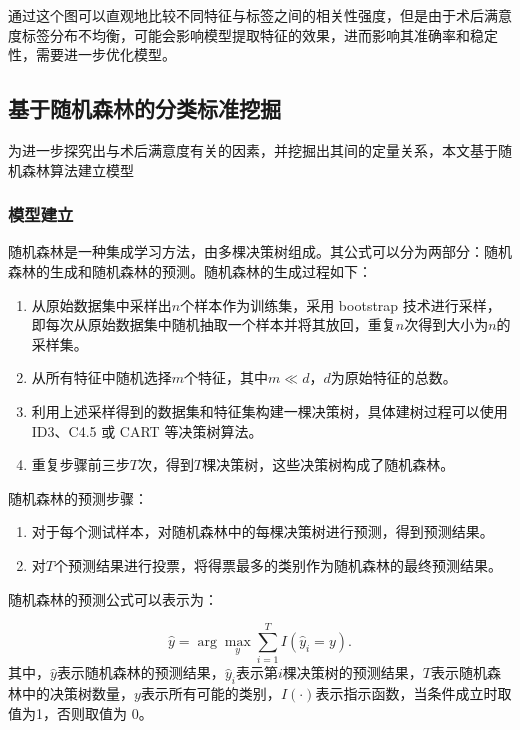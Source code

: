 通过这个图可以直观地比较不同特征与标签之间的相关性强度，但是由于术后满意度标签分布不均衡，可能会影响模型提取特征的效果，进而影响其准确率和稳定性，需要进一步优化模型。


\subsection{基于随机森林的分类标准挖掘}

为进一步探究出与术后满意度有关的因素，并挖掘出其间的定量关系，本文基于随机森林算法建立模型

\subsubsection{模型建立}

随机森林是一种集成学习方法，由多棵决策树组成。其公式可以分为两部分：随机森林的生成和随机森林的预测。随机森林的生成过程如下：

\begin{enumerate}
  \item 从原始数据集中采样出$n$个样本作为训练集，采用 bootstrap 技术进行采样，即每次从原始数据集中随机抽取一个样本并将其放回，重复$n$次得到大小为$n$的采样集。
  \item 从所有特征中随机选择$m$个特征，其中$m\ll d$，$d$为原始特征的总数。
  \item 利用上述采样得到的数据集和特征集构建一棵决策树，具体建树过程可以使用 ID3、C4.5 或 CART 等决策树算法。
  \item 重复步骤前三步$T$次，得到$T$棵决策树，这些决策树构成了随机森林。
\end{enumerate}
  
  
随机森林的预测步骤：

\begin{enumerate}
  \item 对于每个测试样本，对随机森林中的每棵决策树进行预测，得到预测结果。
  \item 对$T$个预测结果进行投票，将得票最多的类别作为随机森林的最终预测结果。
\end{enumerate}

随机森林的预测公式可以表示为：

\begin{equation}
    \widehat{y}=\arg {{\max }_{y}}\sum\limits_{i=1}^{T}{I\left( {{\widehat{y}}_{i}}=y \right)}.
\end{equation}
其中，$\widehat{y}$表示随机森林的预测结果，${{\widehat{y}}_{i}}$表示第$i$棵决策树的预测结果，$T$表示随机森林中的决策树数量，$y$表示所有可能的类别，$I(\cdot )$表示指示函数，当条件成立时取值为1，否则取值为 0。




